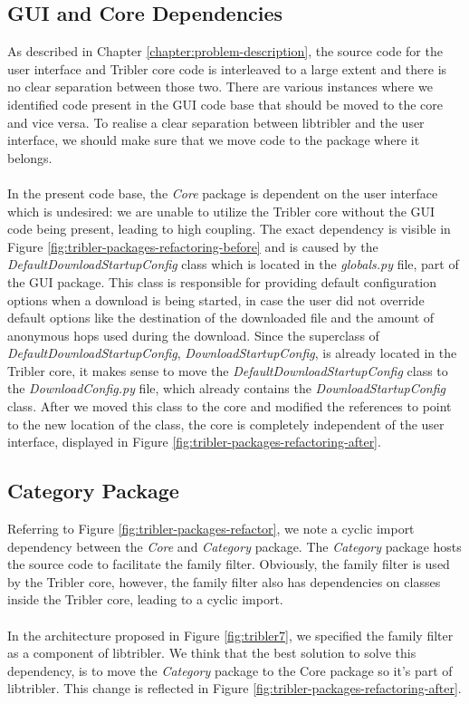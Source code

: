 \subsection{GUI and Core Dependencies}
\label{subsec:gui-core-packages}
As described in Chapter \ref{chapter:problem-description}, the source code for the user interface and Tribler core code is interleaved to a large extent and there is no clear separation between those two. There are various instances where we identified code present in the GUI code base that should be moved to the core and vice versa. To realise a clear separation between libtribler and the user interface, we should make sure that we move code to the package where it belongs.\\\\
In the present code base, the \emph{Core} package is dependent on the user interface which is undesired: we are unable to utilize the Tribler core without the GUI code being present, leading to high coupling. The exact dependency is visible in Figure \ref{fig:tribler-packages-refactoring-before} and is caused by the \emph{DefaultDownloadStartupConfig} class which is located in the \emph{globals.py} file, part of the GUI package. This class is responsible for providing default configuration options when a download is being started, in case the user did not override default options like the destination of the downloaded file and the amount of anonymous hops used during the download. Since the superclass of \emph{DefaultDownloadStartupConfig}, \emph{DownloadStartupConfig}, is already located in the Tribler core, it makes sense to move the \emph{DefaultDownloadStartupConfig} class to the \emph{DownloadConfig.py} file, which already contains the \emph{DownloadStartupConfig} class. After we moved this class to the core and modified the references to point to the new location of the class, the core is completely independent of the user interface, displayed in Figure \ref{fig:tribler-packages-refactoring-after}.

\subsection{Category Package}
Referring to Figure \ref{fig:tribler-packages-refactor}, we note a cyclic import dependency between the \emph{Core} and \emph{Category} package. The \emph{Category} package hosts the source code to facilitate the family filter. Obviously, the family filter is used by the Tribler core, however, the family filter also has dependencies on classes inside the Tribler core, leading to a cyclic import.\\\\
In the architecture proposed in Figure \ref{fig:tribler7}, we specified the family filter as a component of libtribler. We think that the best solution to solve this dependency, is to move the \emph{Category} package to the Core package so it's part of libtribler. This change is reflected in Figure \ref{fig:tribler-packages-refactoring-after}.

